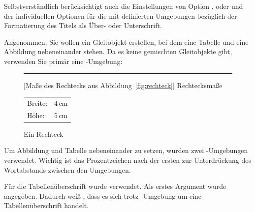 Selbstverständlich berücksichtigt  auch die
Einstellungen von Option ,
 oder
 und der individuellen Optionen für
die mit  definierten Umgebungen
bezüglich der Formatierung des Titels als Über- oder Unterschrift.
\begin{Example}
  Angenommen, Sie wollen ein Gleitobjekt erstellen, bei dem eine Tabelle und
  eine Abbildung nebeneinander stehen. Da es keine gemischten Gleitobjekte gibt,
  verwenden Sie primär eine -Umgebung:
\begin{lstcode}
  \begin{figure}
    \begin{minipage}{.5\linewidth}
      \centering
      \rule{4cm}{5cm}
      \caption{Ein Rechteck}\label{fig:rechteck}
    \end{minipage}%
    \begin{minipage}{.5\linewidth}
      \centering
      [Maße des Rechtecks aus
        Abbildung~\ref{fig:rechteck}]%
      {Rechtecksmaße}
      \label{tab:rechteck}
      \begin{tabular}{ll}
        Breite: & 4\,cm\\
        Höhe:   & 5\,cm
      \end{tabular}
    \end{minipage}
  \end{figure}
\end{lstcode}
  Um Abbildung und Tabelle nebeneinander zu setzen, wurden zwei
  -Umgebungen verwendet. %
  \iffalse %
    Wichtig\textnote{Achtung!} ist hier das Prozentzeichen nach der ersten
    \Environment{minipage}, ohne das ein zusätzlicher Wortabstand zwischen die
    beiden \Environment{minipage}-Umgebungen gesetzt würde.%
  \else %
    Wichtig ist das Prozentzeichen nach der ersten
     zur Unterdrückung des Wortabstands zwischen den
    Umgebungen.%
  \fi %

  %
  Für die Tabellenüberschrift wurde  verwendet. Als
  erstes Argument wurde  angegeben. Dadurch weiß
  , dass es sich trotz -Umgebung um eine
  Tabellenüberschrift handelt.


\end{Example}
